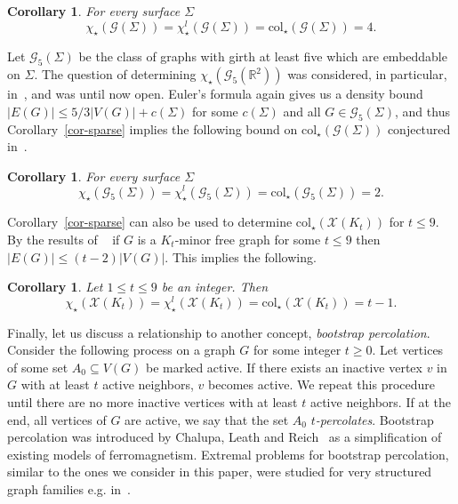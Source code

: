 \documentclass[12pt]{article}
\newtheorem{corollary}[theorem]{Corollary}
\newcommand{\col}{\text{col}}
\newcommand{\mc}[1]{\mathcal{#1}}
\begin{document}
\begin{corollary}\label{cor-surface} For every surface $\Sigma$
$$\chi_\star(\mc{G}(\Sigma)) = \chi^l_\star(\mc{G}(\Sigma)) =\col_\star(\mc{G}(\Sigma)) = 4.$$ 
\end{corollary}  

Let $\mc{G}_5(\Sigma)$ be the class of graphs with girth at least five which are embeddable on $\Sigma$. The question of determining  $\chi_\star(\mc{G}_5(\mathbb{R}^2))$ was considered, in particular, in~\cite{AUW17}, and was until now open.
 Euler's formula again gives us a density bound $|E(G)| \leq 5/3|V(G)|+c(\Sigma)$ for some $c(\Sigma)$ and all $G\in\mc{G}_5(\Sigma)$, and thus Corollary~\ref{cor-sparse} implies the following bound on $\col_\star(\mc{G}(\Sigma))$ conjectured in~\cite[Conjecture 7]{EspOch16}. 
 
\begin{corollary}\label{cor-girth} For every surface $\Sigma$
$$\chi_\star(\mc{G}_5(\Sigma)) = \chi^l_\star(\mc{G}_5(\Sigma)) = \col_\star(\mc{G}_5(\Sigma)) = 2.$$ 
\end{corollary}  

Corollary~\ref{cor-sparse} can also be used to determine $\col_\star(\mc{X}(K_t))$ for $t \leq 9$. By the results of ~\cite{Dirac64,Jorgensen94,Mader68,SonTho06} if $G$ is a $K_t$-minor free graph for some $t \leq 9$ then $|E(G)| \leq (t-2)|V(G)|$. This implies the following.

\begin{corollary}\label{cor-smallkt} Let $1 \leq t \leq 9$ be an integer. Then $$\chi_\star(\mc{X}(K_t)) = \chi^l_\star(\mc{X}(K_t)) =\col_\star(\mc{X}(K_t)) = t-1.$$ 
\end{corollary}


Finally, let us discuss a relationship to another concept, \emph{bootstrap percolation}.  Consider the following process on a graph $G$ for some integer $t\ge 0$.  Let vertices of some set $A_0\subseteq V(G)$
be marked active.  If there exists an inactive vertex $v$ in $G$ with at least $t$ active neighbors, $v$ becomes active.  We repeat this procedure until there are no more inactive vertices
with at least $t$ active neighbors.  If at the end, all vertices of $G$ are active, we say that the set $A_0$ \emph{$t$-percolates}. Bootstrap percolation was introduced by Chalupa, Leath and Reich~\cite{CLR79} as a simplification of existing models of ferromagnetism. Extremal problems for bootstrap percolation, similar to the ones we consider in this paper, were studied for very structured graph families e.g. in~\cite{BalBol06,MorNoe15}. 
\end{document}
